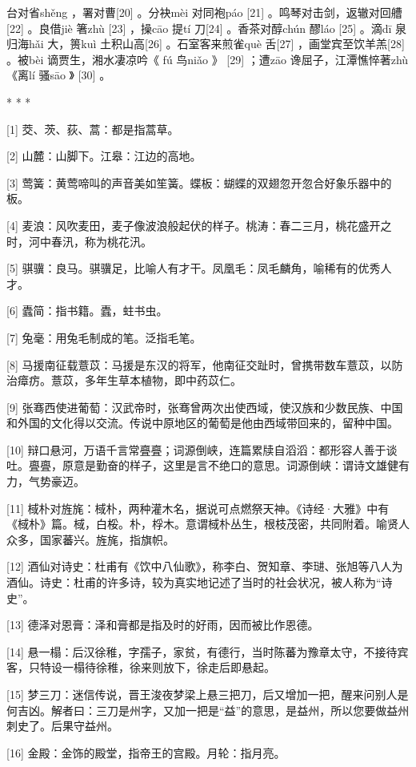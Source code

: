 \documentclass[12pt,UTF8]{ctexbook}
\begin{document}
台对省shěng ，署对曹[20] 。分袂mèi 对同袍páo [21] 。鸣琴对击剑，返辙对回艚[22] 。良借jiè 箸zhù [23] ，操cāo 提tí 刀[24] 。香茶对醇chún 醪láo [25] 。滴dī 泉归海hǎi 大，篑kuì 土积山高[26] 。石室客来煎雀què 舌[27] ，画堂宾至饮羊羔[28] 。被bèi 谪贾生，湘水凄凉吟《 fú 鸟niǎo 》 [29] ；遭zāo 谗屈子，江潭憔悴著zhù 《离lí 骚sāo 》 [30] 。



* * *



[1] 茭、茨、荻、蒿：都是指蒿草。

[2] 山麓：山脚下。江皋：江边的高地。

[3] 莺簧：黄莺啼叫的声音美如笙簧。蝶板：蝴蝶的双翅忽开忽合好象乐器中的板。

[4] 麦浪：风吹麦田，麦子像波浪般起伏的样子。桃涛：春二三月，桃花盛开之时，河中春汛，称为桃花汛。

[5] 骐骥：良马。骐骥足，比喻人有才干。凤凰毛：凤毛麟角，喻稀有的优秀人才。

[6] 蠹简：指书籍。蠹，蛀书虫。

[7] 兔毫：用兔毛制成的笔。泛指毛笔。

[8] 马援南征载薏苡：马援是东汉的将军，他南征交趾时，曾携带数车薏苡，以防治瘴疠。薏苡，多年生草本植物，即中药苡仁。

[9] 张骞西使进葡萄：汉武帝时，张骞曾两次出使西域，使汉族和少数民族、中国和外国的文化得以交流。传说中原地区的葡萄是他由西域带回来的，留种中国。

[10] 辩口悬河，万语千言常亹亹；词源倒峡，连篇累牍自滔滔：都形容人善于谈吐。亹亹，原意是勤奋的样子，这里是言不绝口的意思。词源倒峡：谓诗文雄健有力，气势豪迈。

[11] 棫朴对旌旄：棫朴，两种灌木名，据说可点燃祭天神。《诗经·大雅》中有《棫朴》篇。棫，白桵。朴，桴木。意谓棫朴丛生，根枝茂密，共同附着。喻贤人众多，国家蕃兴。旌旄，指旗帜。

[12] 酒仙对诗史：杜甫有《饮中八仙歌》，称李白、贺知章、李琎、张旭等八人为酒仙。诗史：杜甫的许多诗，较为真实地记述了当时的社会状况，被人称为“诗史”。

[13] 德泽对恩膏：泽和膏都是指及时的好雨，因而被比作恩德。

[14] 悬一榻：后汉徐稚，字孺子，家贫，有德行，当时陈蕃为豫章太守，不接待宾客，只特设一榻待徐稚，徐来则放下，徐走后即悬起。

[15] 梦三刀：迷信传说，晋王浚夜梦梁上悬三把刀，后又增加一把，醒来问别人是何吉凶。解者曰：三刀是州字，又加一把是“益”的意思，是益州，所以您要做益州刺史了。后果守益州。

[16] 金殿：金饰的殿堂，指帝王的宫殿。月轮：指月亮。
\end{document}
